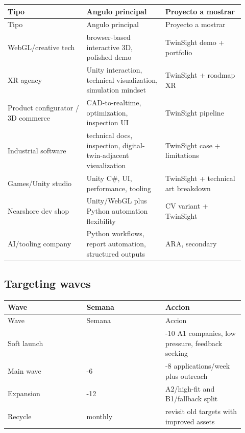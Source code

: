 \begin{center}
\scriptsize
\begin{longtable}{>{\raggedright\arraybackslash}p{0.305\linewidth} >{\raggedright\arraybackslash}p{0.305\linewidth} >{\raggedright\arraybackslash}p{0.305\linewidth}}
\toprule
Tipo & Angulo principal & Proyecto a mostrar \\
\midrule
\endfirsthead
\toprule
Tipo & Angulo principal & Proyecto a mostrar \\
\midrule
\endhead
WebGL/creative tech & browser-based interactive 3D, polished demo & TwinSight demo + portfolio \\
XR agency & Unity interaction, technical visualization, simulation mindset & TwinSight + roadmap XR \\
Product configurator / 3D commerce & CAD-to-realtime, optimization, inspection UI & TwinSight pipeline \\
Industrial software & technical docs, inspection, digital-twin-adjacent visualization & TwinSight case + limitations \\
Games/Unity studio & Unity C\#, UI, performance, tooling & TwinSight + technical art breakdown \\
Nearshore dev shop & Unity/WebGL plus Python automation flexibility & CV variant + TwinSight \\
AI/tooling company & Python workflows, report automation, structured outputs & ARA, secondary \\
\bottomrule
\end{longtable}
\end{center}


\subsection{Targeting waves}


\begin{center}
\scriptsize
\begin{longtable}{>{\raggedright\arraybackslash}p{0.305\linewidth} >{\raggedright\arraybackslash}p{0.305\linewidth} >{\raggedright\arraybackslash}p{0.305\linewidth}}
\toprule
Wave & Semana & Accion \\
\midrule
\endfirsthead
\toprule
Wave & Semana & Accion \\
\midrule
\endhead
Soft launch & 1 & 5-10 A1 companies, low pressure, feedback seeking \\
Main wave & 2-6 & 5-8 applications/week plus outreach \\
Expansion & 6-12 & A2/high-fit and B1/fallback split \\
Recycle & monthly & revisit old targets with improved assets \\
\bottomrule
\end{longtable}
\end{center}


